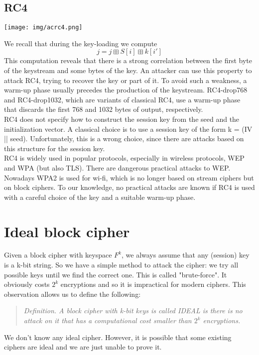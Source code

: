 \documentclass[a4paper, 10pt, titlepage]{article}
\begin{document}
\subsection{RC4}
\begin{center}
\texttt{[image: img/acrc4.png]}
\end{center}
We recall that during the key-loading we compute
$$j = j \boxplus S[i] \boxplus k[i']$$
This computation reveals that there is a strong correlation between the first byte of the keystream and some bytes of the key. An attacker can use this property to attack RC4, trying to recover the key or part of it. To avoid such a weakness, a warm-up phase usually precedes the production of the keystream. RC4-drop768 and RC4-drop1032, which are variants of classical RC4, use a warm-up phase that discards the first 768 and 1032 bytes of output, respectively. \medskip\\
RC4 does not specify how to construct the session key from the seed and the initialization vector. A classical choice is to use a session key of the form k = (IV || seed). Unfortunately, this is a wrong choice, since there are attacks based on this structure for the session key. \medskip\\
RC4 is widely used in popular protocols, especially in wireless protocols, WEP and WPA (but also TLS). There are dangerous practical attacks to WEP. Nowadays WPA2 is used for wi-fi, which is no longer based on stream ciphers but on block ciphers. To our knowledge, no practical attacks are known if RC4 is used with a careful choice of the key and a suitable warm-up phase.

\newpage
\section{Ideal block cipher}
Given a block cipher with keyspace $F^k$, we always assume that any (session) key is a k-bit string. So we have a simple method to attack the cipher: we try all possible keys until we find the correct one. This is called "brute-force". It obviously costs $2^k$ encryptions and so it is impractical for modern ciphers.  This observation allows us to define the following:
\begin{quote}
\textit{Definition. A block cipher with k-bit keys is called IDEAL is there is no attack on it that has a computational cost smaller than $2^k$ encryptions.}
\end{quote}
We don't know any ideal cipher. However, it is possible that some existing ciphers are ideal and we are just unable to prove it.
\end{document}
